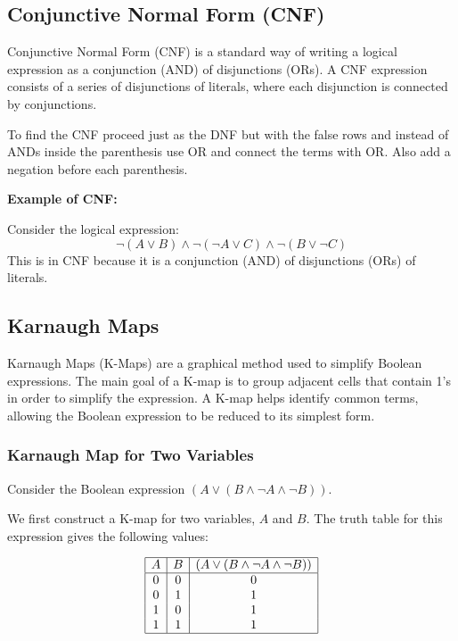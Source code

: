 \subsection{Conjunctive Normal Form (CNF)}

Conjunctive Normal Form (CNF) is a standard way of writing a logical expression as a conjunction (AND)
of disjunctions (ORs). A CNF expression consists of a series of disjunctions of
literals, where each disjunction is connected by conjunctions.
\vspace{\baselineskip}

To find the CNF proceed just as the DNF but with the false rows and instead
of ANDs inside the parenthesis use OR and connect the terms with OR\@. 
Also add a negation before each parenthesis.
\vspace{\baselineskip}

\textbf{Example of CNF:}
\vspace{\baselineskip}

Consider the logical expression:
\[
	\neg (A \lor B) \land \neg (\neg A \lor C) \land \neg (B \lor \neg C)
\]
This is in CNF because it is a conjunction (AND) of disjunctions (ORs) of literals.

\subsection{Karnaugh Maps}

Karnaugh Maps (K-Maps) are a graphical method used to simplify Boolean expressions. The main goal of a K-map is to group adjacent cells that contain 1's in order to simplify the expression. A K-map helps identify common terms, allowing the Boolean expression to be reduced to its simplest form.

\subsubsection{Karnaugh Map for Two Variables}

Consider the Boolean expression \( (A \lor (B \land \neg A \land \neg B)) \).
\vspace{\baselineskip}

We first construct a K-map for two variables, \( A \) and \( B \). The truth table for this expression gives the following values:

\[
	\begin{array}{|c|c|c|}
		\hline
		A & B & (A \lor (B \land \neg A \land \neg B)) \\
		\hline
		0 & 0 & 0                                      \\
		0 & 1 & 1                                      \\
		1 & 0 & 1                                      \\
		1 & 1 & 1                                      \\
		\hline
	\end{array}
\]

